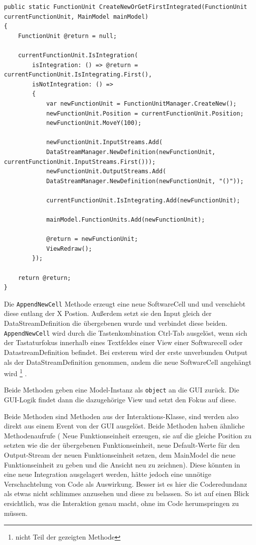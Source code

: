 \begin{lstlisting}[caption=CreateNewOrGetFirstIntegrated]
public static FunctionUnit CreateNewOrGetFirstIntegrated(FunctionUnit currentFunctionUnit, MainModel mainModel)
{
	FunctionUnit @return = null;
	
	currentFunctionUnit.IsIntegration(
		isIntegration: () => @return = 		currentFunctionUnit.IsIntegrating.First(),
		isNotIntegration: () =>
		{
			var newFunctionUnit = FunctionUnitManager.CreateNew();
			newFunctionUnit.Position = currentFunctionUnit.Position;
			newFunctionUnit.MoveY(100);
			
			newFunctionUnit.InputStreams.Add(
			DataStreamManager.NewDefinition(newFunctionUnit, currentFunctionUnit.InputStreams.First()));
			newFunctionUnit.OutputStreams.Add(
			DataStreamManager.NewDefinition(newFunctionUnit, "()"));
			
			currentFunctionUnit.IsIntegrating.Add(newFunctionUnit);
			
			mainModel.FunctionUnits.Add(newFunctionUnit);
			
			@return = newFunctionUnit;
			ViewRedraw();
		});
	
	return @return;
}
	\end{lstlisting}





	Die \texttt{AppendNewCell} Methode erzeugt eine neue SoftwareCell und und
	verschiebt diese entlang der X Postion.
	Außerdem setzt sie den Input gleich der DataStreamDefinition die
	übergebenen wurde und verbindet diese beiden.
	\texttt{AppendNewCell} wird durch die Tastenkombination Ctrl-Tab ausgelöst, wenn
	sich der Tastaturfokus innerhalb eines Textfeldes einer View einer Softwarecell oder
	DatastreamDefinition befindet. Bei ersterem wird der erste unverbunden Output als der
	DataStreamDefinition genommen, andem die neue SoftwareCell angehängt wird \footnote{nicht Teil der gezeigten Methode} .
	
	Beide Methoden geben eine
	Model-Instanz als \texttt{object} an die GUI zurück. Die GUI-Logik findet dann die
	dazugehörige View und setzt den Fokus auf diese.
	
	Beide Methoden sind Methoden aus der Interaktions-Klasse, sind werden also
	direkt aus einem Event von der GUI ausgelöst. 
	Beide Methoden haben ähnliche Methodenaufrufe ( Neue Funktionseinheit
	erzeugen, sie auf die gleiche Position zu setzten wie die der übergebenen
	Funktionseinheit, neue Default-Werte für den Output-Stream der neuen
	Funktionseinheit setzen, dem MainModel die neue Funktionseinheit zu geben
	und die Ansicht neu zu zeichnen). Diese könnten in eine neue
	Integration ausgelagert werden, hätte jedoch eine unnötige
	Verschachtelung von Code als Auswirkung. Besser ist es hier die
	Coderedundanz als etwas nicht schlimmes anzusehen und diese zu belassen.
	So ist auf einen Blick ersichtlich, was die Interaktion genau macht, ohne
	im Code herumspringen zu müssen.

